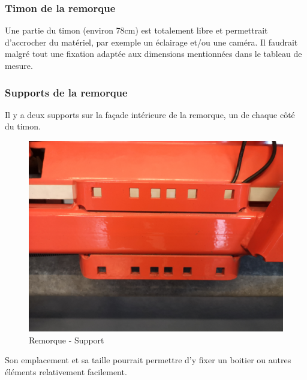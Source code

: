 \subsubsection{Timon de la remorque}
Une partie du timon (environ 78cm) est totalement libre et permettrait d'accrocher du matériel, par exemple un éclairage et/ou une caméra.
Il faudrait malgré tout une fixation adaptée aux dimensions mentionnées dans le tableau de mesure.
\subsubsection{Supports de la remorque}
Il y a deux supports sur la façade intérieure de la remorque, un de chaque côté du timon.
\begin{figure}[H]
    \centering
    \includegraphics[width=13cm]{assets/figures/support.jpg}
    \caption{Remorque - Support}
\end{figure}

Son emplacement et sa taille pourrait permettre d'y fixer un boitier ou autres éléments relativement facilement.